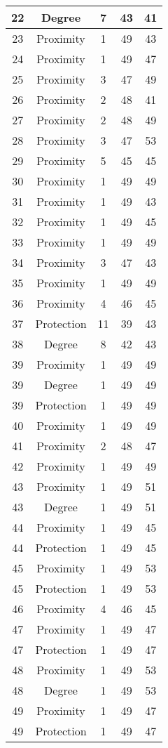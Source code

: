 \documentclass[results.tex]{subfiles}
\begin{document}
\begin{center}
\begin{tabular}{| c || c | c | c | c |}
    \hline
    22 & Degree & 7 & 43 & 41 \\ 
    \hline
    23 & Proximity & 1 & 49 & 43 \\ 
    \hline
    24 & Proximity & 1 & 49 & 47 \\ 
    \hline
    25 & Proximity & 3 & 47 & 49 \\ 
    \hline
    26 & Proximity & 2 & 48 & 41 \\ 
    \hline
    27 & Proximity & 2 & 48 & 49 \\ 
    \hline
    28 & Proximity & 3 & 47 & 53 \\ 
    \hline
    29 & Proximity & 5 & 45 & 45 \\ 
    \hline
    30 & Proximity & 1 & 49 & 49 \\ 
    \hline
    31 & Proximity & 1 & 49 & 43 \\ 
    \hline
    32 & Proximity & 1 & 49 & 45 \\ 
    \hline
    33 & Proximity & 1 & 49 & 49 \\ 
    \hline
    34 & Proximity & 3 & 47 & 43 \\ 
    \hline
    35 & Proximity & 1 & 49 & 49 \\ 
    \hline
    36 & Proximity & 4 & 46 & 45 \\ 
    \hline
    37 & Protection & 11 & 39 & 43 \\ 
    \hline
    38 & Degree & 8 & 42 & 43 \\ 
    \hline
    39 & Proximity & 1 & 49 & 49 \\ 
    \hline
    39 & Degree & 1 & 49 & 49 \\ 
    \hline
    39 & Protection & 1 & 49 & 49 \\ 
    \hline
    40 & Proximity & 1 & 49 & 49 \\ 
    \hline
    41 & Proximity & 2 & 48 & 47 \\ 
    \hline
    42 & Proximity & 1 & 49 & 49 \\ 
    \hline
    43 & Proximity & 1 & 49 & 51 \\ 
    \hline
    43 & Degree & 1 & 49 & 51 \\ 
    \hline
    44 & Proximity & 1 & 49 & 45 \\ 
    \hline
    44 & Protection & 1 & 49 & 45 \\ 
    \hline
    45 & Proximity & 1 & 49 & 53 \\ 
    \hline
    45 & Protection & 1 & 49 & 53 \\ 
    \hline
    46 & Proximity & 4 & 46 & 45 \\ 
    \hline
    47 & Proximity & 1 & 49 & 47 \\ 
    \hline
    47 & Protection & 1 & 49 & 47 \\ 
    \hline
    48 & Proximity & 1 & 49 & 53 \\ 
    \hline
    48 & Degree & 1 & 49 & 53 \\ 
    \hline
    49 & Proximity & 1 & 49 & 47 \\ 
    \hline
    49 & Protection & 1 & 49 & 47 \\ 
    \hline   \end{tabular}
\end{center}
\end{document}
